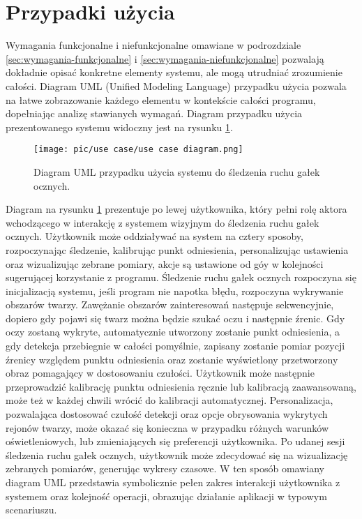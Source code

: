 \documentclass[a4paper,twoside,12pt]{book}
\begin{document}
\section{Przypadki użycia}
\label{sec:przypadki-uzycia}

Wymagania funkcjonalne i niefunkcjonalne omawiane w podrozdziale \ref{sec:wymagania-funkcjonalne} i \ref{sec:wymagania-niefunkcjonalne} pozwalają dokładnie opisać konkretne elementy systemu, ale mogą utrudniać zrozumienie całości. Diagram UML (Unified Modeling Language) przypadku użycia pozwala na łatwe zobrazowanie każdego elementu w kontekście całości programu, dopełniając analizę stawianych wymagań. Diagram przypadku użycia prezentowanego systemu widoczny jest na rysunku \ref{fig:UML-use-case}. 

\begin{figure}[h]
	\centering
	\texttt{[image: pic/use case/use case diagram.png]}
	\caption{Diagram UML przypadku użycia systemu do śledzenia ruchu gałek ocznych.}
	\label{fig:UML-use-case}
\end{figure}

Diagram na rysunku \ref{fig:UML-use-case} prezentuje po lewej użytkownika, który pełni rolę aktora wchodzącego w interakcję z systemem wizyjnym do śledzenia ruchu gałek ocznych. Użytkownik może oddziaływać na system na cztery sposoby, rozpoczynając śledzenie, kalibrując punkt odniesienia, personalizując ustawienia oraz wizualizując zebrane pomiary, akcje są ustawione od góy w kolejności sugerującej korzystanie z programu. Śledzenie ruchu gałek ocznych rozpoczyna się inicjalizacją systemu, jeśli program nie napotka błędu, rozpoczyna wykrywanie obszarów twarzy. Zawężanie obszarów zainteresowań następuje sekwencyjnie, dopiero gdy pojawi się twarz można będzie szukać oczu i następnie źrenic. Gdy oczy zostaną wykryte, automatycznie utworzony zostanie punkt odniesienia, a gdy detekcja przebiegnie w całości pomyślnie, zapisany zostanie pomiar pozycji źrenicy względem punktu odniesienia oraz zostanie wyświetlony przetworzony obraz pomagający w dostosowaniu czułości. Użytkownik może następnie przeprowadzić kalibrację punktu odniesienia ręcznie lub kalibracją zaawansowaną, może też w każdej chwili wrócić do kalibracji automatycznej. Personalizacja, pozwalająca dostosować czułość detekcji oraz opcje obrysowania wykrytych rejonów twarzy, może okazać się konieczna w przypadku różnych warunków oświetleniowych, lub zmieniających się preferencji użytkownika. Po udanej sesji śledzenia ruchu gałek ocznych, użytkownik może zdecydować się na wizualizację zebranych pomiarów, generując wykresy czasowe. W ten sposób omawiany diagram UML przedstawia symbolicznie pełen zakres interakcji użytkownika z systemem oraz kolejność operacji, obrazując działanie aplikacji w typowym scenariuszu.
\end{document}
